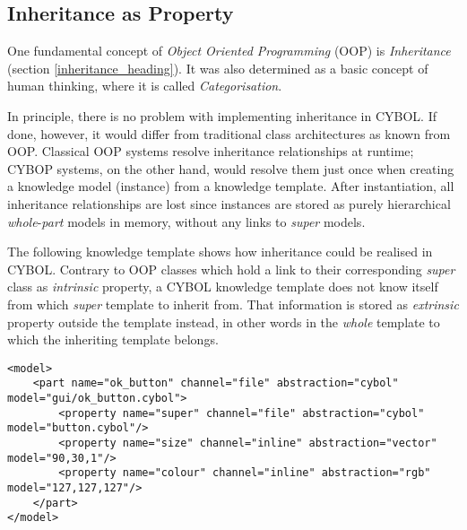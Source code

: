 %
%
%
%
%
%
%

\subsection{Inheritance as Property}
\label{inheritance_as_property_heading}

One fundamental concept of \emph{Object Oriented Programming} (OOP) is
\emph{Inheritance} (section \ref{inheritance_heading}). It was also determined
as a basic concept of human thinking, where it is called \emph{Categorisation}.

In principle, there is no problem with implementing inheritance in CYBOL. If
done, however, it would differ from traditional class architectures as known
from OOP. Classical OOP systems resolve inheritance relationships at runtime;
CYBOP systems, on the other hand, would resolve them just once when creating a
knowledge model (instance) from a knowledge template. After instantiation, all
inheritance relationships are lost since instances are stored as purely
hierarchical \emph{whole}-\emph{part} models in memory, without any links to
\emph{super} models.

The following knowledge template shows how inheritance could be realised in
CYBOL. Contrary to OOP classes which hold a link to their corresponding
\emph{super} class as \emph{intrinsic} property, a CYBOL knowledge template
does not know itself from which \emph{super} template to inherit from. That
information is stored as \emph{extrinsic} property outside the template
instead, in other words in the \emph{whole} template to which the inheriting
template belongs.

\begin{scriptsize}
    \begin{verbatim}
<model>
    <part name="ok_button" channel="file" abstraction="cybol" model="gui/ok_button.cybol">
        <property name="super" channel="file" abstraction="cybol" model="button.cybol"/>
        <property name="size" channel="inline" abstraction="vector" model="90,30,1"/>
        <property name="colour" channel="inline" abstraction="rgb" model="127,127,127"/>
    </part>
</model>
    \end{verbatim}
\end{scriptsize}

